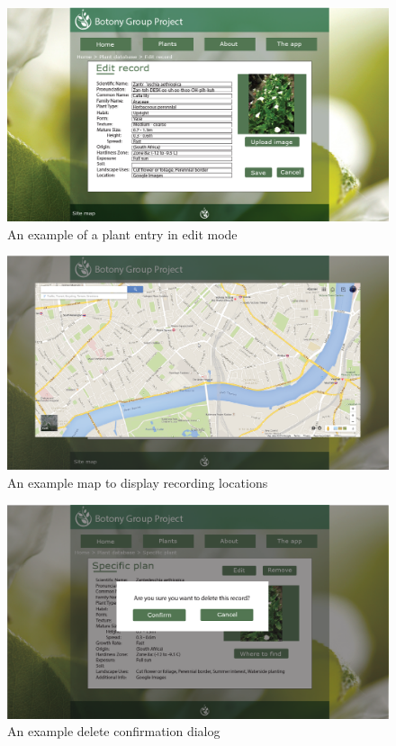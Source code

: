 \begin{landscape}
            \begin{figure}
                \centering
                \includegraphics[scale=0.4]{uiDesign/uiwebimages/edit.png}
                \caption{An example of a plant entry in edit mode}
                \label{fig:editWeb}
           \end{figure}

            \begin{figure}
                \centering
                \includegraphics[scale=0.4]{uiDesign/uiwebimages/map.png}
                \caption{An example map to display recording locations}
                \label{fig:mapWeb}
            \end{figure}

            \begin{figure}
                \centering
                \includegraphics[scale=0.4]{uiDesign/uiwebimages/delete.png}
                \caption{An example delete confirmation dialog}
                \label{fig:delete}
            \end{figure}
        \end{landscape}